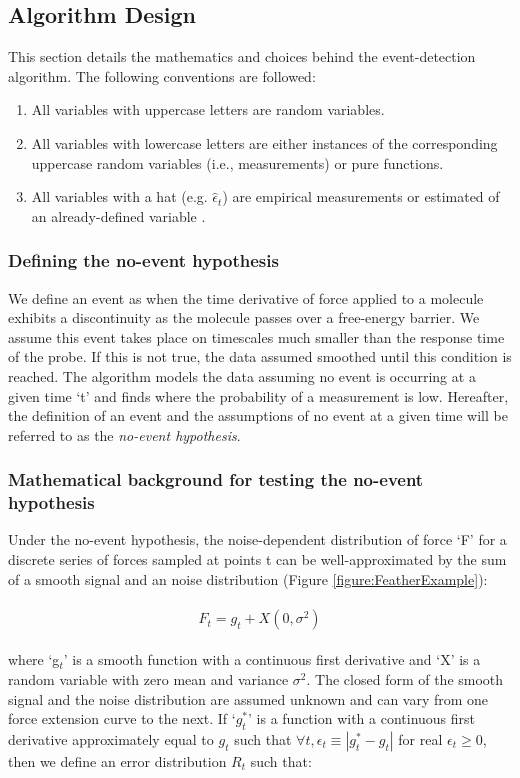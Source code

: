 \documentclass[%
  aip,12pt,tightenlines,
  amsthm,
 amsmath,amssymb
]{article}
\newcommand{\eqs}[1]{
\begin{align*} 
\begin{split}
#1
\end{split}					
\end{align*}}
\newcommand{\fRef}[1]{Figure \ref{figure:#1}}
\newcommand{\firstp}[0]{}
\newcommand{\pl}[0]{\vspace{6pt}}
\begin{document}
\subsection{Algorithm Design}

This section details the mathematics and choices behind the event-detection algorithm. The following conventions are followed:

\begin{enumerate}
 \item All variables with uppercase letters are random variables.
 \item All variables with lowercase letters are either instances of the corresponding uppercase random variables (i.e., measurements) or pure functions.
 \item All variables with a hat (e.g. $\hat{\epsilon}_t$) are empirical measurements or estimated of an already-defined variable .
\end{enumerate}

\subsubsection{Defining the no-event hypothesis}

\firstp We define an event as when the time derivative of force applied to a molecule exhibits a discontinuity as the molecule passes over a free-energy barrier. We assume this event takes place on timescales much smaller than the response time of the probe. If this is not true, the data assumed smoothed until this condition is reached. The algorithm models the data assuming no event is occurring at a given time `t' and finds where the probability of a measurement is low. Hereafter, the definition of an event and the assumptions of no event at a given time will be referred to as the \emph{no-event hypothesis}. 

\subsubsection{Mathematical background for testing the no-event hypothesis}

\firstp Under the no-event hypothesis, the noise-dependent distribution of force `F' for a discrete series of forces sampled at points t can be well-approximated by the sum of a smooth signal and an noise distribution (\fRef{FeatherExample}):

\eqs{ F_t = g_t + X(0,\sigma^2) }

where `g$_t$' is a smooth function with a continuous first derivative and `X' is a random variable with zero mean and variance $\sigma^2$. The closed form of the smooth signal and the noise distribution are assumed unknown and can vary from one force extension curve to the next. If `$g^{*}_t$' is a function with a continuous first derivative approximately equal to $g_t$ such that $\forall t,\epsilon_t\equiv|g^{*}_t-g_t|$ for real $\epsilon_t\ge 0$, then we define an error distribution $R_t$ such that: \pl
\end{document}
